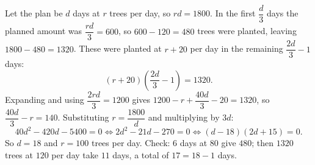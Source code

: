 Let the plan be $d$ days at $r$ trees per day, so $rd=1800$. In the first $\dfrac {d}{3}$ days the planned amount was $\dfrac{rd}{3}=600$, so $600-120=480$ trees were planted, leaving $1800-480=1320$. These were planted at $r+20$ per day in the remaining $\dfrac{2d}{3}-1$ days:
\[
(r+20)\left(\dfrac{2d}{3}-1\right)=1320 .
\]
Expanding and using $\dfrac{2rd}{3}=1200$ gives $1200-r+\dfrac{40d}{3}-20=1320$, so $\dfrac{40d}{3}-r=140$. Substituting $r=\dfrac{1800}{d}$ and multiplying by $3d$:
\[
40d^2-420d-5400=0\iff 2d^2-21d-270=0\iff (d-18)(2d+15)=0 .
\]
So $d=18$ and $r=\boxed{100}$ trees per day. Check: $6$ days at $80$ give $480$; then $1320$ trees at $120$ per day take $11$ days, a total of $17=18-1$ days.
